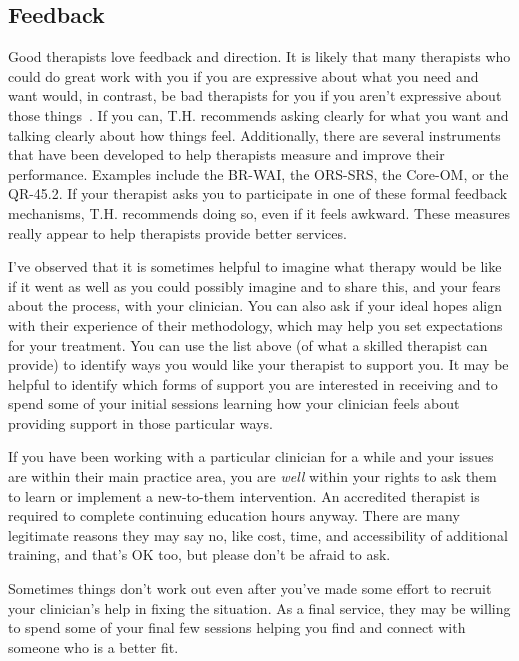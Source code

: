 \documentclass[11pt,oneside]{book}
\let\cite\parencite
\begin{document}
\subsection*{Feedback}
Good therapists love feedback and direction. It is likely that many therapists who could do great work with you if you are expressive about what you need and want would, in contrast, be bad therapists for you if you aren't expressive about those things~\cite{macdonald2015correcting,delgadillo2022progress,lambert2001effects,oanes2015therapists}. If you can, T.H. recommends asking clearly for what you want and talking clearly about how things feel. Additionally, there are several instruments that have been developed to help therapists measure and improve their performance. Examples include the BR-WAI, the ORS-SRS, the Core-OM, or the QR-45.2. If your therapist asks you to participate in one of these formal feedback mechanisms, T.H. recommends doing so, even if it feels awkward. These measures really appear to help therapists provide better services.

I've observed that it is sometimes helpful to imagine what therapy would be like if it went as well as you could possibly imagine and to share this, and your fears about the process, with your clinician. You can also ask if your ideal hopes align with their experience of their methodology, which may help you set expectations for your treatment. You can use the list above (of what a skilled therapist can provide) to identify ways you would like your therapist to support you. It may be helpful to identify which forms of support you are interested in receiving and to spend some of your initial sessions learning how your clinician feels about providing support in those particular ways.

If you have been working with a particular clinician for a while and your issues are within their main practice area, you are \textit{well} within your rights to ask them to learn or implement a new-to-them intervention. An accredited therapist is required to complete continuing education hours anyway. There are many legitimate reasons they may say no, like cost, time, and accessibility of additional training, and that's OK too, but please don't be afraid to ask.

Sometimes things don't work out even after you've made some effort to recruit your clinician's help in fixing the situation. As a final service, they may be willing to spend some of your final few sessions helping you find and connect with someone who is a better fit.
\end{document}
